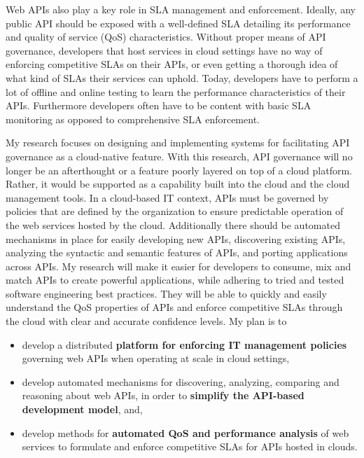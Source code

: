 Web APIs also play a key role in SLA
management and enforcement. Ideally, any public API should be exposed with a well-defined
SLA detailing its performance and quality of service (QoS) characteristics. Without proper means
of API governance, developers that host services in cloud settings have no way of enforcing
competitive SLAs on their APIs, or even getting a thorough idea of what kind of SLAs
their services can uphold. Today, developers have to perform a lot of offline
and online testing to learn the performance characteristics of their APIs.
Furthermore developers often have to be content with basic SLA monitoring 
as opposed to comprehensive SLA enforcement. 

My research focuses on designing and implementing systems for facilitating 
API governance as a cloud-native feature. With this research, API
governance will no longer be an afterthought or a feature poorly layered on
top of a cloud platform. Rather, it would be supported as a capability built into
the cloud and the cloud management tools. 
In a cloud-based IT context, APIs must be governed by
policies that are defined by the organization to ensure predictable
operation of the web services hosted by the cloud. Additionally
there should be automated mechanisms in place for easily developing new
APIs, discovering existing APIs, analyzing the syntactic and semantic features
of APIs, and porting applications across APIs. My research will make 
it easier for developers to consume, mix and match APIs to create powerful
applications, while adhering to tried and tested software engineering 
best practices. They will be able to quickly and easily understand
the QoS properties of APIs and enforce competitive SLAs through the cloud
with clear and accurate confidence levels. My plan is to
\begin{itemize}
\item develop a distributed {\bf platform for enforcing IT 
management policies} governing
web APIs when operating at scale in cloud settings,
\item develop automated mechanisms for discovering, analyzing, comparing and reasoning
about web APIs, in order to {\bf simplify the API-based development model}, and,
\item develop methods for {\bf automated QoS and performance analysis} of web services
to formulate and enforce competitive SLAs for APIs hosted in clouds.
\end{itemize}

